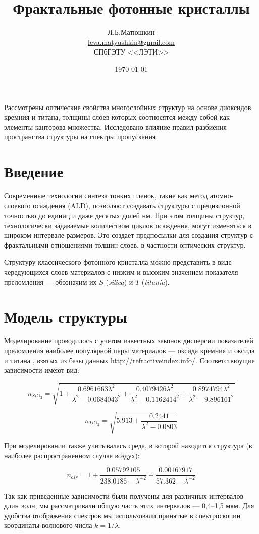 \documentclass[a4paper, 12pt, oneside]{article}
\title{Фрактальные фотонные кристаллы}
\author{Л.\:Б.\:Матюшкин \\  \href{mailto:leva.matyushkin@gmail.com}{leva.matyushkin@gmail.com}\\
	СПбГЭТУ <<ЛЭТИ>>}
\date{\today}
\begin{document}
\maketitle
	Рассмотрены оптические свойства многослойных структур на основе диоксидов кремния и титана, толщины слоев которых соотносятся между собой как элементы канторова множества. Исследовано влияние правил разбиения пространства структуры на спектры пропускания.

\section*{Введение}
Современные технологии синтеза тонких пленок, такие как метод атомно-слоевого осаждения (ALD), позволяют создавать структуры с прецизионной точностью до единиц и даже десятых долей нм. При этом толщины структур, технологически задаваемые количеством циклов осаждения, могут изменяться в широком интервале размеров. Это создает предпосылки для создания структур с фрактальными отношениями толщин слоев, в частности оптических структур.

Структуру классического фотонного кристалла можно представить в виде чередующихся слоев материалов с низким и высоким значением показателя преломления --- обозначим их $S$ (\emph{silica}) и $T$ (\emph{titania}).

\section{Модель структуры}
Моделирование проводилось с учетом известных законов дисперсии показателей преломления наиболее популярной пары материалов --- оксида кремния  и оксида и титана , взятых из базы данных http://refractiveindex.info/. Соответствюущие зависимости имеют вид:
	
$$n_{SiO_2}= \sqrt{1 + \frac{0.6961663\lambda^2}{\lambda^2-0.0684043^2}+\frac{0.4079426\lambda^2}{\lambda^2-0.1162414^2}+\frac{0.8974794\lambda^2}{\lambda^2-9.896161^2}}$$

$$n_{TiO_2}= \sqrt{5.913+\frac{0.2441}{\lambda^2-0.0803}}$$

При моделировании также учитывалась среда, в которой находится структура (в наиболее распространенном случае воздух):

$$n_{air}= 1+\frac{0.05792105}{238.0185-\lambda^{-2}}+\frac{0.00167917}{57.362-\lambda^{-2}}$$

Так как приведенные зависимости были получены для различных интервалов длин волн, мы рассматривали общую часть этих интервалов --- 0,4--1,5 мкм. Для удобства отображения спектров мы использовали принятые в спектроскопии координаты волнового числа $k = 1/\lambda$.
\end{document}
